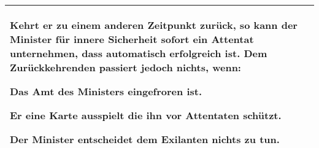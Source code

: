 \documentclass[5pt]{article}
\begin{document}
\begin{tabular}{p{4cm}p{14.5cm}}
{	Kehrt er zu einem anderen Zeitpunkt zurück, so \textbf{kann} der Minister für innere Sicherheit sofort ein Attentat unternehmen, dass automatisch erfolgreich ist.
	Dem Zurückkehrenden passiert jedoch nichts, wenn:
	\begin{citemize}
		\item Das Amt des Ministers eingefroren ist.
		\item Er eine Karte ausspielt die ihn vor Attentaten schützt.
		\item Der Minister entscheidet dem Exilanten nichts zu tun.
	\end{citemize}
	
	
	
	
	
	
	 }    \\

 
    
    
    
    \bottomrule
    \end{tabular}
    
    
    
\end{document}
